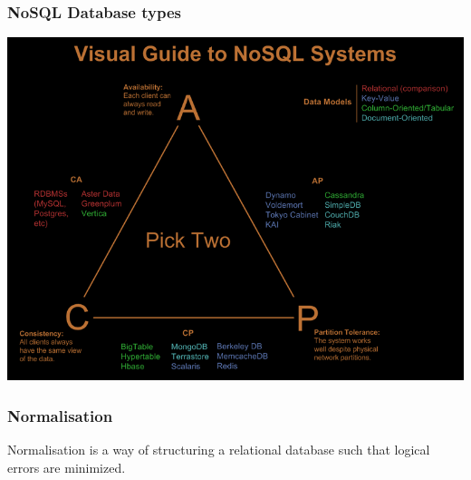 \subsubsection{NoSQL Database types}
\includegraphics[scale=0.5]{images/cap_choice.png}


\subsubsection{Normalisation}
Normalisation is a way of structuring a relational database such that logical errors are minimized. 

